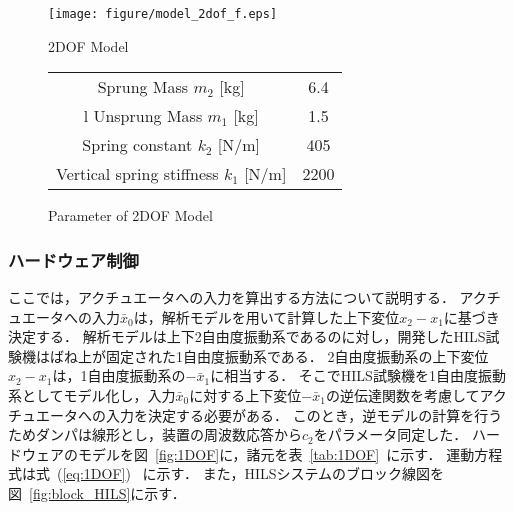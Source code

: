 \documentclass[a4paper,12pt]{article_vdlab_sotsuron}
\begin{document}
\vspace{10mm}
\begin{figure}[h]
  \begin{minipage}{0.3\hsize}
     \begin{center}
      \texttt{[image: figure/model\_2dof\_f.eps]}
	\vspace{2mm}
      \caption{2DOF Model}
      \label{fig:2DOF}
    \end{center}
  \end{minipage}
\begin{minipage}{0.65\hsize}
\makeatletter
\def\@captype{table}
\makeatother
  \begin{center}
   \caption{Parameter of 2DOF Model}
   \label{tab:2DOF}
   \begin{tabular}{cc}\hline
      Sprung Mass $m_2$ [kg] & 6.4  \\l
      Unsprung Mass $m_1$ [kg] & 1.5 \\
      Spring constant $k_2$ [N/m] & 405  \\
      Vertical spring stiffness $k_1$ [N/m] & 2200   \\ \hline
    \end{tabular}
   \end{center}
 \end{minipage}
\end{figure}

\newpage
\subsubsection{ハードウェア制御}
ここでは，アクチュエータへの入力を算出する方法について説明する．
アクチュエータへの入力$\bar{x}_0$は，解析モデルを用いて計算した上下変位$x_2-x_1$に基づき決定する．
解析モデルは上下2自由度振動系であるのに対し，開発したHILS試験機はばね上が固定された1自由度振動系である．
2自由度振動系の上下変位$x_2-x_1$は，1自由度振動系の$-\bar{x}_1$に相当する．
そこでHILS試験機を1自由度振動系としてモデル化し，入力$\bar{x}_0$に対する上下変位$-\bar{x}_1$の逆伝達関数を考慮してアクチュエータへの入力を決定する必要がある．
このとき，逆モデルの計算を行うためダンパは線形とし，装置の周波数応答から$c_2$をパラメータ同定した．
ハードウェアのモデルを図~\ref{fig:1DOF}に，諸元を表~\ref{tab:1DOF}~に示す．
運動方程式は式~(\ref{eq:1DOF})~ に示す．
また，HILSシステムのブロック線図を図~\ref{fig:block_HILS}に示す．
\end{document}
